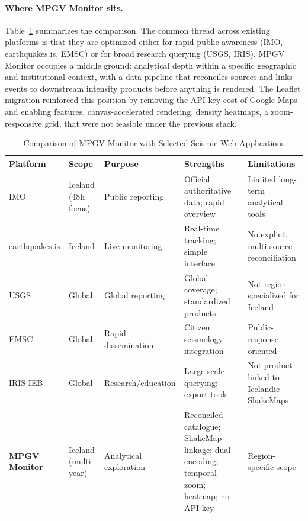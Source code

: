 \documentclass[12pt]{article}
\begin{document}
\paragraph{Where MPGV Monitor sits.}
Table~\ref{tab:seismic_comparison} summarizes the comparison. The common thread across existing platforms is that they are optimized either for rapid public awareness (IMO, earthquakes.is, EMSC) or for broad research querying (USGS, IRIS). MPGV Monitor occupies a middle ground: analytical depth within a specific geographic and institutional context, with a data pipeline that reconciles sources and links events to downstream intensity products before anything is rendered. The Leaflet migration reinforced this position by removing the API-key cost of Google Maps and enabling features, canvas-accelerated rendering, density heatmaps, a zoom-responsive grid, that were not feasible under the previous stack.

\begin{table}[h]
\centering
\small
\begin{tabular}{p{3cm} p{2.5cm} p{2.5cm} p{3cm} p{3cm}}
\hline
\textbf{Platform} & \textbf{Scope} & \textbf{Purpose} & \textbf{Strengths} & \textbf{Limitations} \\
\hline

IMO & Iceland (48h focus) & Public reporting & Official authoritative data; rapid overview & Limited long-term analytical tools \\

earthquakes.is & Iceland & Live monitoring & Real-time tracking; simple interface & No explicit multi-source reconciliation \\

USGS & Global & Global reporting & Global coverage; standardized products & Not region-specialized for Iceland \\

EMSC & Global & Rapid dissemination & Citizen seismology integration & Public-response oriented \\

IRIS IEB & Global & Research/education & Large-scale querying; export tools & Not product-linked to Icelandic ShakeMaps \\

\textbf{MPGV Monitor} & Iceland (multi-year) & Analytical exploration & Reconciled catalogue; ShakeMap linkage; dual encoding; temporal zoom; heatmap; no API key & Region-specific scope \\

\hline
\end{tabular}
\caption{Comparison of MPGV Monitor with Selected Seismic Web Applications}
\label{tab:seismic_comparison}
\end{table}
\end{document}
